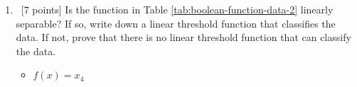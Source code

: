 \begin{enumerate}
\item ~[7 points] Is the function in Table
  \ref{tab:boolean-function-data-2} linearly separable? If so, write
  down a linear threshold function that classifies the data. If not,
  prove that there is no linear threshold function that can classify
  the data.

  \begin{itemize}
    \item $f(x) = x_{4}$
  \end{itemize}
\end{enumerate}

